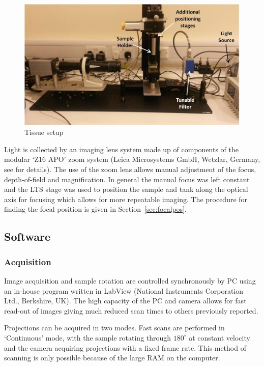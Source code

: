 \begin{figure}
\centering
\includegraphics[width=\linewidth]{meth_img/tissue_setup}
\caption{Tissue setup}
\label{fig:tissue_setup}
\end{figure}


Light is collected by an imaging lens system made up of  components of the modular `Z16 APO' zoom system  (Leica Microsystems GmbH, Wetzlar, Germany, see \cite{Doran:2010hn} for details). The use of the zoom lens allows manual adjustment of the focus, depth-of-field and magnification. In general the manual focus was left constant and the LTS stage was used to position the sample and tank along the optical axis for focusing which allows for more repeatable imaging. The procedure for finding the focal position is given  in Section~\ref{sec:focalpos}.








\subsection{Software}
\subsubsection{Acquisition}




Image acquisition and sample rotation are controlled synchronously  by PC using an in-house program written in LabView (National Instruments Corporation Ltd., Berkshire, UK). The high capacity of the PC and camera allows for fast read-out of images giving much reduced scan times to others previously reported. 

Projections can be acquired in two modes. Fast scans are performed in `Continuous' mode, with the sample rotating through $180^{\circ}$ at constant velocity and the camera acquiring projections with a fixed frame rate. This method of scanning is only possible because of the large RAM on the computer. 

